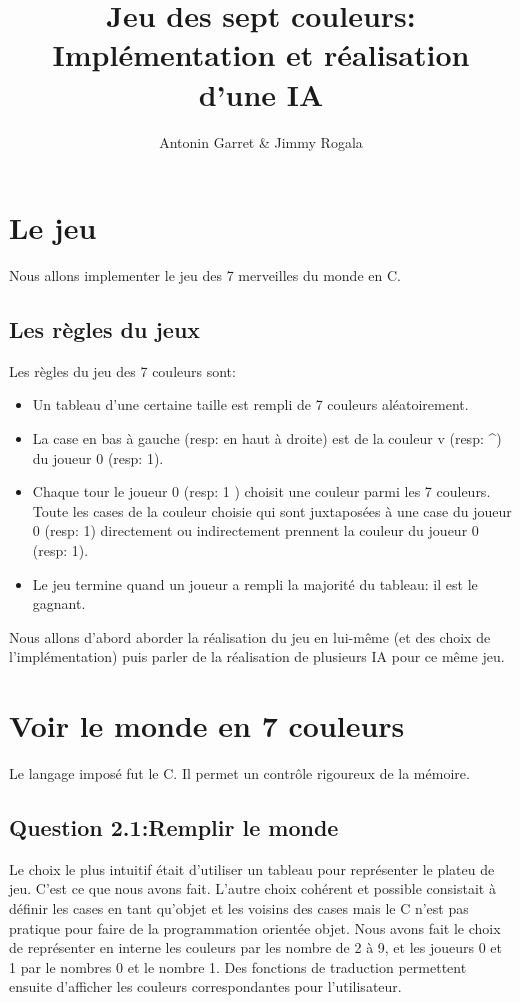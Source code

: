 \documentclass[11pt]{article}
\title{Jeu des sept couleurs: Implémentation et réalisation d'une IA}
\author{Antonin Garret & Jimmy Rogala}
\begin{document}

\section{Le jeu}
Nous allons implementer le jeu des 7 merveilles du monde en C.

  \subsection{Les règles du jeux}
    Les règles du jeu des 7 couleurs sont:
    \begin{itemize} %
      \item Un tableau d'une certaine taille est rempli de 7 couleurs aléatoirement.
      \item La case en bas à gauche (resp: en haut à droite) est de la couleur v (resp: \textasciicircum ) du joueur 0 (resp: 1).
      \item Chaque tour le joueur 0 (resp: 1 ) choisit une couleur parmi les 7 couleurs. Toute les cases de la couleur choisie qui sont juxtaposées à une case du joueur 0 (resp: 1) directement ou indirectement prennent la couleur du joueur 0 (resp: 1).
      \item Le jeu termine quand un joueur a rempli la majorité du tableau: il est le gagnant.
    \end{itemize}

    Nous allons d'abord aborder la réalisation du jeu en lui-même (et des choix de l'implémentation) puis parler de la réalisation de plusieurs IA pour ce même jeu.


\section{Voir le monde en 7 couleurs}
    Le langage imposé fut le C. Il permet un contrôle rigoureux de la mémoire.
    \subsection*{Question 2.1:Remplir le monde}
      Le choix le plus intuitif était d'utiliser un tableau pour représenter le plateu de jeu. C'est ce que nous avons fait. L'autre choix cohérent et possible consistait à définir les cases en tant qu'objet et les voisins des cases mais le C n'est pas pratique pour faire de la programmation orientée objet.
      Nous avons fait le choix de représenter en interne les couleurs par les nombre de 2 à 9, et les joueurs 0 et 1 par le nombres 0 et le nombre 1. Des fonctions de traduction permettent ensuite d'afficher les couleurs correspondantes pour l'utilisateur.
\end{document}
